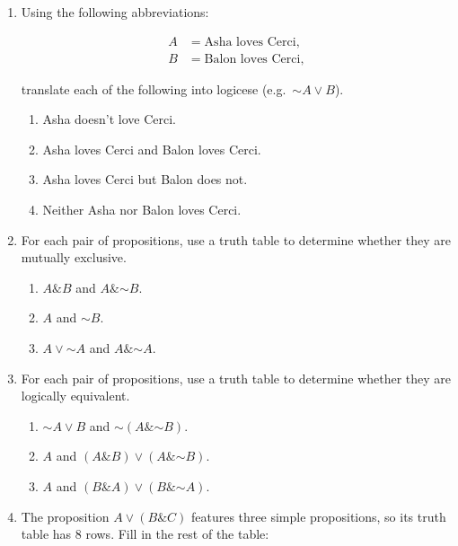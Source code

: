 \documentclass[justified]{tufte-book}
\providecommand{\tightlist}{%
  \setlength{\itemsep}{0pt}\setlength{\parskip}{0pt}}
\renewcommand{\neg}{\mathbin{\sim}}
\renewcommand{\wedge}{\mathbin{\&}}
\theoremstyle{definition}
\theoremstyle{definition}
\theoremstyle{definition}
\theoremstyle{definition}
\theoremstyle{remark}
\begin{document}
\begin{enumerate}
\item
  Using the following abbreviations:

  \[
    \begin{aligned}
       A &= \mbox{Asha loves Cerci},\\
       B &= \mbox{Balon loves Cerci},
    \end{aligned}
  \]

  translate each of the following into logicese (e.g.~\(\neg A \vee B\)).

  \begin{enumerate}
  \def\labelenumii{\alph{enumii}.}
  \tightlist
  \item
    Asha doesn't love Cerci.
  \item
    Asha loves Cerci and Balon loves Cerci.
  \item
    Asha loves Cerci but Balon does not.
  \item
    Neither Asha nor Balon loves Cerci.
  \end{enumerate}
\item
  For each pair of propositions, use a truth table to determine whether they are mutually exclusive.

  \begin{enumerate}
  \def\labelenumii{\alph{enumii}.}
  \tightlist
  \item
    \(A \wedge B\) and \(A \wedge \neg B\).
  \item
    \(A\) and \(\neg B\).
  \item
    \(A \vee \neg A\) and \(A \wedge \neg A\).
  \end{enumerate}
\item
  For each pair of propositions, use a truth table to determine whether they are logically equivalent.

  \begin{enumerate}
  \def\labelenumii{\alph{enumii}.}
  \tightlist
  \item
    \(\neg A \vee B\) and \(\neg (A \wedge \neg B)\).
  \item
    \(A\) and \((A \wedge B) \vee (A \wedge \neg B)\).
  \item
    \(A\) and \((B \wedge A) \vee (B \wedge \neg A)\).
  \end{enumerate}
\item
  The proposition \(A \vee (B \wedge C)\) features three simple propositions, so its truth table has 8 rows. Fill in the rest of the table:


\end{enumerate}
\end{document}
